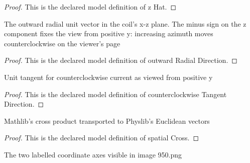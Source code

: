 \begin{proof}
  This is the declared model definition of z Hat.
\end{proof}
\begin{definition}
  \label{def:physics:phyx-mini-0950:phyxminiproblems-problemphyxmini0950-outwardradialdirection}
  The outward radial unit vector in the coil's x-z plane. The minus sign on the z component fixes the view from positive y: increasing azimuth moves counterclockwise on the viewer's page
\end{definition}
\begin{proof}
  This is the declared model definition of outward Radial Direction.
\end{proof}
\begin{definition}
  \label{def:physics:phyx-mini-0950:phyxminiproblems-problemphyxmini0950-counterclockwisetangentdirection}
  Unit tangent for counterclockwise current as viewed from positive y
\end{definition}
\begin{proof}
  This is the declared model definition of counterclockwise Tangent Direction.
\end{proof}
\begin{definition}
  \label{def:physics:phyx-mini-0950:phyxminiproblems-problemphyxmini0950-spatialcross}
  Mathlib's cross product transported to Physlib's Euclidean vectors
\end{definition}
\begin{proof}
  This is the declared model definition of spatial Cross.
\end{proof}
\begin{definition}
  \label{def:physics:phyx-mini-0950:phyxminiproblems-problemphyxmini0950-diagramaxis}
  The two labelled coordinate axes visible in image 950.png
\end{definition}
